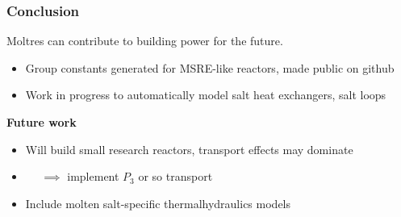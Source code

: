 \begin{frame}
  \frametitle{Conclusion}
        Moltres can contribute to building power for the future.
        \begin{itemize}
                \item Group constants generated for MSRE-like reactors, made public on github
                \item Work in progress to automatically model salt heat exchangers, salt loops
        \end{itemize}

        \textbf{Future work}
        \begin{itemize}
            \item Will build small research reactors, transport effects may dominate
            \item $\quad$ $\implies$ implement $P_3$ or so transport
            \item Include molten salt-specific thermalhydraulics models
        \end{itemize}



\end{frame}

